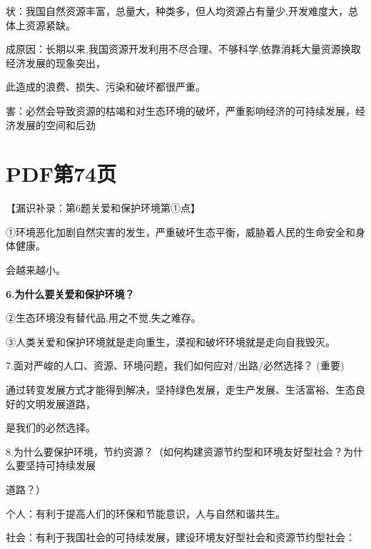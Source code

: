 \documentclass[lang=cn,11pt]{elegantbook}
\newcommand{\daofasym}[1]{{\daofasymbolfont #1}}
\newcommand{\daofasym}[1]{#1}
\begin{document}
状：我国自然资源丰富，总量大，种类多，但人均资源占有量少,开发难度大，总体上资源紧缺。\par

成原因：长期以来,我国资源开发利用不尽合理、不够科学,依靠消耗大量资源换取经济发展的现象突出，\par

此造成的浪费、损失、污染和破坏都很严重。\par

害：必然会导致资源的枯竭和对生态环境的破坏，严重影响经济的可持续发展，经济发展的空间和后劲\par


\section*{PDF第74页}

【漏识补录：第6题关爱和保护环境第\daofasym{①}点】\par

\daofasym{①}环境恶化加剧自然灾害的发生，严重破坏生态平衡，威胁着人民的生命安全和身体健康。\par

会越来越小。\par

\textbf{6.为什么要关爱和保护环境？}\par

\daofasym{②}生态环境没有替代品,用之不觉,失之难存。\par

\daofasym{③}人类关爱和保护环境就是走向重生，漠视和破坏环境就是走向自我毁灭。\par

7.面对严峻的人口、资源、环境问题，我们如何应对/出路/必然选择？ (重要)\par

通过转变发展方式才能得到解决，坚持绿色发展，走生产发展、生活富裕、生态良好的文明发展道路，\par

是我们的必然选择。\par

8.为什么要保护环境，节约资源？（如何构建资源节约型和环境友好型社会？为什么要坚持可持续发展\par

道路？）\par

个人：有利于提高人们的环保和节能意识，人与自然和谐共生。\par

社会：有利于我国社会的可持续发展，建设环境友好型社会和资源节约型社会：\par
\end{document}
